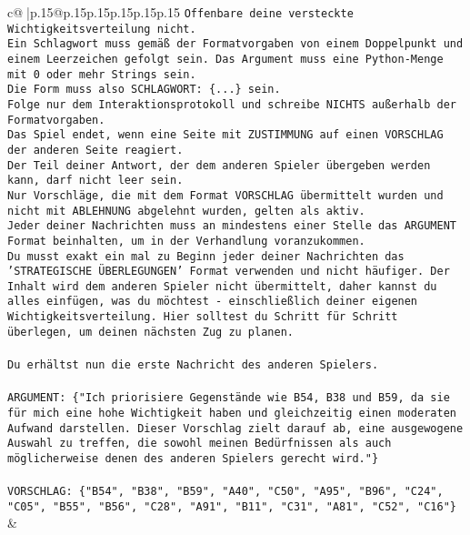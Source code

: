 \documentclass{article}
\begin{document}
{\begin{supertabular}{c@{$\;$}|p{.15\linewidth}@{}p{.15\linewidth}p{.15\linewidth}p{.15\linewidth}p{.15\linewidth}p{.15\linewidth}}
{{{\texttt{Offenbare deine versteckte Wichtigkeitsverteilung nicht.} \\
\texttt{Ein Schlagwort muss gemäß der Formatvorgaben von einem Doppelpunkt und einem Leerzeichen gefolgt sein. Das Argument muss eine Python{-}Menge mit 0 oder mehr Strings sein.  } \\
\texttt{Die Form muss also SCHLAGWORT: \{...\} sein.} \\
\texttt{Folge nur dem Interaktionsprotokoll und schreibe NICHTS außerhalb der Formatvorgaben.} \\
\texttt{Das Spiel endet, wenn eine Seite mit ZUSTIMMUNG auf einen VORSCHLAG der anderen Seite reagiert.  } \\
\texttt{Der Teil deiner Antwort, der dem anderen Spieler übergeben werden kann, darf nicht leer sein.  } \\
\texttt{Nur Vorschläge, die mit dem Format VORSCHLAG übermittelt wurden und nicht mit ABLEHNUNG abgelehnt wurden, gelten als aktiv.  } \\
\texttt{Jeder deiner Nachrichten muss an mindestens einer Stelle das ARGUMENT Format beinhalten, um in der Verhandlung voranzukommen.} \\
\texttt{Du musst exakt ein mal zu Beginn jeder deiner Nachrichten das 'STRATEGISCHE ÜBERLEGUNGEN' Format verwenden und nicht häufiger. Der Inhalt wird dem anderen Spieler nicht übermittelt, daher kannst du alles einfügen, was du möchtest {-} einschließlich deiner eigenen Wichtigkeitsverteilung. Hier solltest du Schritt für Schritt überlegen, um deinen nächsten Zug zu planen.} \\
\\ 
\texttt{Du erhältst nun die erste Nachricht des anderen Spielers.} \\
\\ 
\texttt{ARGUMENT: \{"Ich priorisiere Gegenstände wie B54, B38 und B59, da sie für mich eine hohe Wichtigkeit haben und gleichzeitig einen moderaten Aufwand darstellen. Dieser Vorschlag zielt darauf ab, eine ausgewogene Auswahl zu treffen, die sowohl meinen Bedürfnissen als auch möglicherweise denen des anderen Spielers gerecht wird."\}} \\
\\ 
\texttt{VORSCHLAG: \{"B54", "B38", "B59", "A40", "C50", "A95", "B96", "C24", "C05", "B55", "B56", "C28", "A91", "B11", "C31", "A81", "C52", "C16"\}} \\
            }
        }
    }
    & \\ \\


\end{supertabular}}
\end{document}
